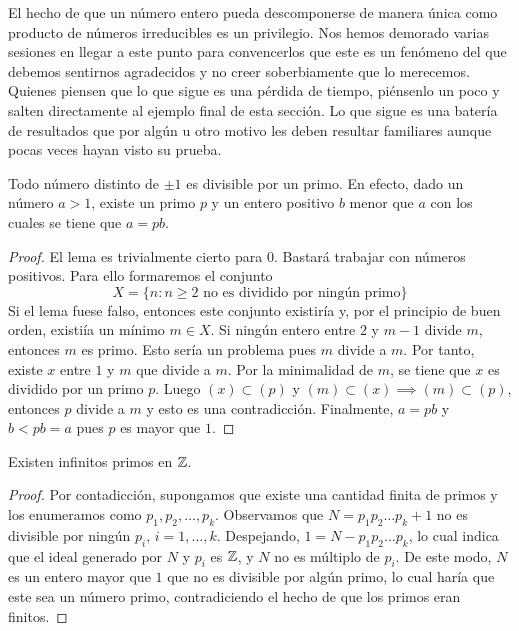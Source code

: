 \documentclass[main.tex]{subfiles}
\begin{document}
El hecho de que un n\'umero entero pueda descomponerse de manera \'unica como producto de n\'umeros irreducibles es un privilegio. Nos hemos demorado varias sesiones en llegar a este punto para convencerlos que este es un fen\'omeno del que debemos sentirnos agradecidos y no creer soberbiamente que lo merecemos. Quienes piensen que lo que sigue es una p\'erdida de tiempo, pi\'ensenlo un poco y salten directamente al ejemplo final de esta secci\'on. Lo que sigue es una bater\'ia de resultados que por alg\'un u otro motivo les deben resultar familiares aunque pocas veces hayan visto su prueba.

\begin{lemma}
    Todo n\'umero distinto de $\pm 1$ es divisible por un primo. En efecto, dado un n\'umero $a > 1$, existe un primo $p$ y un entero positivo $b$ menor que $a$ con los cuales se tiene que $a = pb$.
\end{lemma}

\begin{proof}
    El lema es trivialmente cierto para $0$. Bastar\'a trabajar con n\'umeros positivos. Para ello formaremos el conjunto
    $$X = \{n : n \geq 2 \text{ no es dividido por ning\'un primo}\}$$
    Si el lema fuese falso, entonces este conjunto existir\'ia y, por el principio de buen orden, existi\'ia un m\'inimo $m \in X$. Si ning\'un entero entre $2$ y $m - 1$ divide $m$, entonces $m$ es primo. Esto ser\'ia un problema pues $m$ divide a $m$. Por tanto, existe $x$ entre $1$ y $m$ que divide a $m$. Por la minimalidad de $m$, se tiene que $x$ es dividido por un primo $p$. Luego $(x) \subset (p)$ y $(m) \subset (x) \implies (m) \subset (p)$, entonces $p$ divide a $m$ y esto es una contradicci\'on.
    Finalmente, $a = pb$ y $b < pb = a$ pues $p$ es mayor que $1$.
\end{proof}

\begin{theorem}
    Existen infinitos primos en $\mathbb Z$.
\end{theorem}

\begin{proof}
    Por contadicci\'on, supongamos que existe una cantidad finita de primos y los enumeramos como $p_1, p_2, \dots, p_k$. Observamos que $N = p_1 p_2 \dots p_k + 1$ no es divisible por ning\'un $p_i$, $i = 1, \dots, k$. Despejando, $1 = N - p_1 p_2 \dots p_k$, lo cual indica que el ideal generado por $N$ y $p_i$ es $\mathbb Z$, y $N$ no es m\'ultiplo de $p_i$. De este modo, $N$ es un entero mayor que $1$ que no es divisible por alg\'un primo, lo cual har\'ia que este sea un n\'umero primo, contradiciendo el hecho de que los primos eran finitos.
\end{proof}
\end{document}
